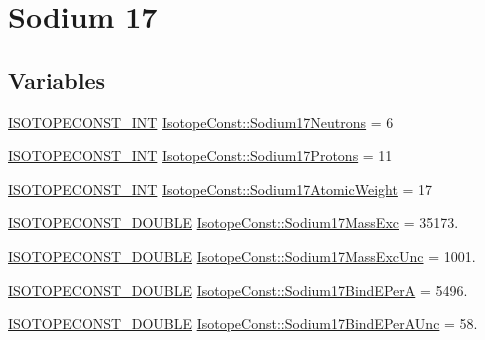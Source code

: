 \hypertarget{group___isotope_const-_sodium-_na17}{}\section{Sodium 17}
\label{group___isotope_const-_sodium-_na17}
\subsection*{Variables}
\begin{DoxyCompactItemize}
\item 
\mbox{\hyperlink{group___isotope_const-_macros_ga5f18360b3e99483a35c32d789e62621c}{I\+S\+O\+T\+O\+P\+E\+C\+O\+N\+S\+T\+\_\+\+I\+NT}} \mbox{\hyperlink{group___isotope_const-_sodium-_na17_gaa3ee23854da10c20aad95a0acf779e78}{Isotope\+Const\+::\+Sodium17\+Neutrons}} = 6
\item 
\mbox{\hyperlink{group___isotope_const-_macros_ga5f18360b3e99483a35c32d789e62621c}{I\+S\+O\+T\+O\+P\+E\+C\+O\+N\+S\+T\+\_\+\+I\+NT}} \mbox{\hyperlink{group___isotope_const-_sodium-_na17_gae8759ee9b7a6674168ffe67a0606144a}{Isotope\+Const\+::\+Sodium17\+Protons}} = 11
\item 
\mbox{\hyperlink{group___isotope_const-_macros_ga5f18360b3e99483a35c32d789e62621c}{I\+S\+O\+T\+O\+P\+E\+C\+O\+N\+S\+T\+\_\+\+I\+NT}} \mbox{\hyperlink{group___isotope_const-_sodium-_na17_ga9ebfab20c9270178ef965a1119812eb2}{Isotope\+Const\+::\+Sodium17\+Atomic\+Weight}} = 17
\item 
\mbox{\hyperlink{group___isotope_const-_macros_ga8f45a7272ce02c0b4c65c44636ed719a}{I\+S\+O\+T\+O\+P\+E\+C\+O\+N\+S\+T\+\_\+\+D\+O\+U\+B\+LE}} \mbox{\hyperlink{group___isotope_const-_sodium-_na17_ga4c7fad07934fca6f1b3cb33c15506fb2}{Isotope\+Const\+::\+Sodium17\+Mass\+Exc}} = 35173.
\item 
\mbox{\hyperlink{group___isotope_const-_macros_ga8f45a7272ce02c0b4c65c44636ed719a}{I\+S\+O\+T\+O\+P\+E\+C\+O\+N\+S\+T\+\_\+\+D\+O\+U\+B\+LE}} \mbox{\hyperlink{group___isotope_const-_sodium-_na17_ga77d1900c58d0b2edf392a473d3f65da6}{Isotope\+Const\+::\+Sodium17\+Mass\+Exc\+Unc}} = 1001.
\item 
\mbox{\hyperlink{group___isotope_const-_macros_ga8f45a7272ce02c0b4c65c44636ed719a}{I\+S\+O\+T\+O\+P\+E\+C\+O\+N\+S\+T\+\_\+\+D\+O\+U\+B\+LE}} \mbox{\hyperlink{group___isotope_const-_sodium-_na17_ga11d7eda6db4c5bb835aa69d09655ec28}{Isotope\+Const\+::\+Sodium17\+Bind\+E\+PerA}} = 5496.
\item 
\mbox{\hyperlink{group___isotope_const-_macros_ga8f45a7272ce02c0b4c65c44636ed719a}{I\+S\+O\+T\+O\+P\+E\+C\+O\+N\+S\+T\+\_\+\+D\+O\+U\+B\+LE}} \mbox{\hyperlink{group___isotope_const-_sodium-_na17_ga63a3b67967d78cadba347717a273862d}{Isotope\+Const\+::\+Sodium17\+Bind\+E\+Per\+A\+Unc}} = 58.

\end{DoxyCompactItemize}
